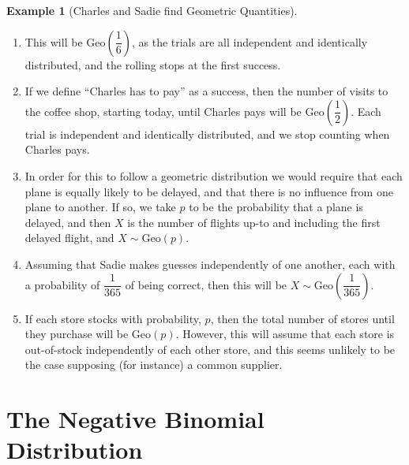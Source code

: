 \documentclass[
  letterpaper,
  DIV=11,
  numbers=noendperiod]{scrreprt}
\providecommand{\tightlist}{%
  \setlength{\itemsep}{0pt}\setlength{\parskip}{0pt}}\usepackage{longtable,booktabs,array}
\theoremstyle{definition}
\theoremstyle{definition}
\newtheorem{example}{Example}[chapter]
\theoremstyle{definition}
\theoremstyle{remark}
\begin{document}
\begin{example}[Charles and Sadie find Geometric
Quantities]
\begin{tcolorbox}[enhanced jigsaw, colback=white, colframe=quarto-callout-color-frame, arc=.35mm, leftrule=.75mm, rightrule=.15mm, opacityback=0, breakable, bottomrule=.15mm, left=2mm, toprule=.15mm]
\begin{enumerate}
\def\labelenumi{\alph{enumi}.}
\tightlist
\item
  This will be \(\text{Geo}(\dfrac{1}{6})\), as the trials are all
  independent and identically distributed, and the rolling stops at the
  first success.
\item
  If we define ``Charles has to pay'' as a success, then the number of
  visits to the coffee shop, starting today, until Charles pays will be
  \(\text{Geo}(\dfrac{1}{2})\). Each trial is independent and
  identically distributed, and we stop counting when Charles pays.
\item
  In order for this to follow a geometric distribution we would require
  that each plane is equally likely to be delayed, and that there is no
  influence from one plane to another. If so, we take \(p\) to be the
  probability that a plane is delayed, and then \(X\) is the number of
  flights up-to and including the first delayed flight, and
  \(X\sim\text{Geo}(p)\).
\item
  Assuming that Sadie makes guesses independently of one another, each
  with a probability of \(\dfrac{1}{365}\) of being correct, then this
  will be \(X\sim\text{Geo}(\dfrac{1}{365})\).
\item
  If each store stocks with probability, \(p\), then the total number of
  stores until they purchase will be \(\text{Geo}(p)\). However, this
  will assume that each store is out-of-stock independently of each
  other store, and this seems unlikely to be the case supposing (for
  instance) a common supplier.
\end{enumerate}

\end{tcolorbox}

\end{example}

\section{The Negative Binomial
Distribution}\label{the-negative-binomial-distribution}
\end{document}
